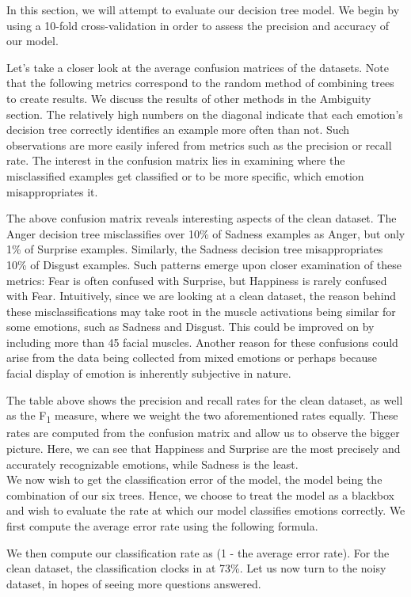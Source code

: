 In this section, we will attempt to evaluate our decision tree model. We begin by using a 10-fold cross-validation
in order to assess the precision and accuracy of our model. 

Let's take a closer look at the average confusion matrices of the datasets.
Note that the following metrics correspond to the random method of combining trees to create results.
We discuss the results of other methods in the Ambiguity section.
The relatively high numbers on the diagonal indicate that each emotion's decision tree correctly
identifies an example more often than not. Such observations are more easily infered from metrics such as the precision or recall rate.
The interest in the confusion matrix lies in examining where the misclassified examples get classified or to be more specific,
which emotion misappropriates it. 



The above confusion matrix reveals interesting aspects of the clean dataset.
The Anger decision tree misclassifies over 10\% of Sadness examples as Anger, but only 1\% of Surprise examples.
Similarly, the Sadness decision tree misappropriates 10\% of Disgust examples.
Such patterns emerge upon closer examination of these metrics: Fear is often confused with Surprise, but Happiness is rarely confused with Fear.
Intuitively, since we are looking at a clean dataset,
the reason behind these misclassifications may take root in the muscle activations being similar for some emotions, such as Sadness and Disgust.
This could be improved on by including  more than 45 facial muscles.
Another reason for these confusions could arise from the data being collected from mixed emotions or perhaps because facial display
of emotion is inherently subjective in nature.



The table above shows the precision and recall rates for the clean dataset, as well as the F\textsubscript{1} measure,
where we weight the two aforementioned rates equally. These rates are computed from the confusion matrix and allow us to
observe the bigger picture. Here, we can see that Happiness and Surprise are the most precisely and accurately recognizable
emotions, while Sadness is the least. \\


\newpage
We now wish to get the classification error of the model, the model being the combination of our six trees.
Hence, we choose to treat the model as a blackbox and wish to evaluate the rate at which our model classifies emotions correctly.
We first compute the average error rate using the following formula.

We then compute our classification rate as (1 - the average error rate).
For the clean dataset, the classification clocks in at 73\%.
Let us now turn to the noisy dataset, in hopes of seeing more questions answered.

